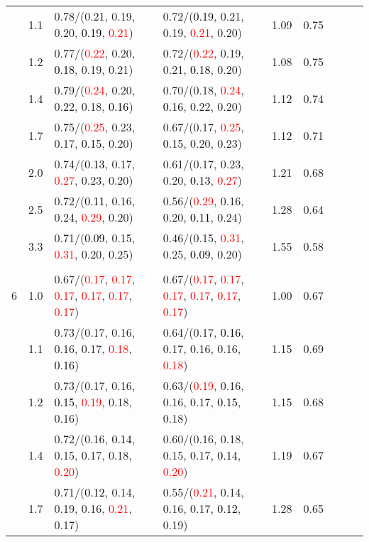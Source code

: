 \documentclass[10pt,a4paper]{report}
\begin{document}
\begin{table}[!htbp]
\begin{center}
{\begin{tabular}{ccllccccc}
			&1.1&0.78/(0.21, 0.19, 0.20, \textcolor{black}{0.19}, \textcolor{red}{0.21})&0.72/(\textcolor{black}{0.19}, 0.21, 0.19, \textcolor{red}{0.21}, 0.20)&1.09&0.75\\
			&1.2&0.77/(\textcolor{red}{0.22}, 0.20, \textcolor{black}{0.18}, 0.19, 0.21)&0.72/(\textcolor{red}{0.22}, 0.19, 0.21, \textcolor{black}{0.18}, 0.20)&1.08&0.75\\
			&1.4&0.79/(\textcolor{red}{0.24}, 0.20, 0.22, 0.18, \textcolor{black}{0.16})&0.70/(0.18, \textcolor{red}{0.24}, \textcolor{black}{0.16}, 0.22, 0.20)&1.12&0.74\\
			&1.7&0.75/(\textcolor{red}{0.25}, 0.23, 0.17, \textcolor{black}{0.15}, 0.20)&0.67/(0.17, \textcolor{red}{0.25}, \textcolor{black}{0.15}, 0.20, 0.23)&1.12&0.71\\
			&2.0&0.74/(\textcolor{black}{0.13}, 0.17, \textcolor{red}{0.27}, 0.23, 0.20)&0.61/(0.17, 0.23, 0.20, \textcolor{black}{0.13}, \textcolor{red}{0.27})&1.21&0.68\\
			&2.5&0.72/(\textcolor{black}{0.11}, 0.16, 0.24, \textcolor{red}{0.29}, 0.20)&0.56/(\textcolor{red}{0.29}, 0.16, 0.20, \textcolor{black}{0.11}, 0.24)&1.28&0.64\\
			&3.3&0.71/(\textcolor{black}{0.09}, 0.15, \textcolor{red}{0.31}, 0.20, 0.25)&0.46/(0.15, \textcolor{red}{0.31}, 0.25, \textcolor{black}{0.09}, 0.20)&1.55&0.58\\
			&&&&\\
			6			&1.0&0.67/(\textcolor{red}{0.17}, \textcolor{red}{0.17}, \textcolor{red}{0.17}, \textcolor{red}{0.17}, \textcolor{red}{0.17}, \textcolor{red}{0.17})&0.67/(\textcolor{red}{0.17}, \textcolor{red}{0.17}, \textcolor{red}{0.17}, \textcolor{red}{0.17}, \textcolor{red}{0.17}, \textcolor{red}{0.17})&1.00&0.67\\
			&1.1&0.73/(0.17, 0.16, 0.16, 0.17, \textcolor{red}{0.18}, \textcolor{black}{0.16})&0.64/(0.17, \textcolor{black}{0.16}, 0.17, 0.16, 0.16, \textcolor{red}{0.18})&1.15&0.69\\
			&1.2&0.73/(0.17, 0.16, \textcolor{black}{0.15}, \textcolor{red}{0.19}, 0.18, 0.16)&0.63/(\textcolor{red}{0.19}, 0.16, 0.16, 0.17, \textcolor{black}{0.15}, 0.18)&1.15&0.68\\
			&1.4&0.72/(0.16, \textcolor{black}{0.14}, 0.15, 0.17, 0.18, \textcolor{red}{0.20})&0.60/(0.16, 0.18, 0.15, 0.17, \textcolor{black}{0.14}, \textcolor{red}{0.20})&1.19&0.67\\
			&1.7&0.71/(\textcolor{black}{0.12}, 0.14, 0.19, 0.16, \textcolor{red}{0.21}, 0.17)&0.55/(\textcolor{red}{0.21}, 0.14, 0.16, 0.17, \textcolor{black}{0.12}, 0.19)&1.28&0.65\\

\end{tabular}}
\end{center}
\end{table}
\end{document}
